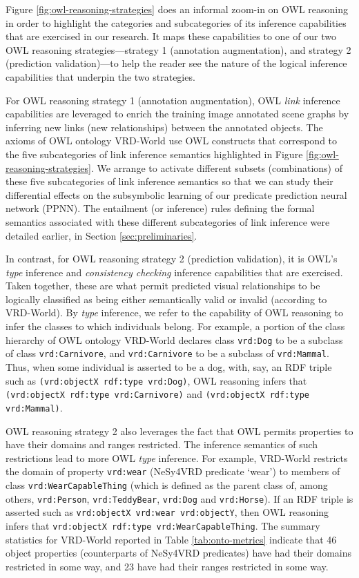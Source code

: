 \documentclass[]{jair}
\begin{document}
Figure \ref{fig:owl-reasoning-strategies} does an informal zoom-in on OWL reasoning in order to highlight the categories and subcategories of its inference capabilities that are exercised in our research.
It maps these capabilities to one of our two OWL reasoning strategies---strategy 1 (annotation augmentation), and strategy 2 (prediction validation)---to help the reader see the nature of the logical inference capabilities that underpin the two strategies.

For OWL reasoning strategy 1 (annotation augmentation), OWL \emph{link} inference capabilities are leveraged to enrich the training image annotated scene graphs by inferring new links (new relationships) between the annotated objects.
The axioms of OWL ontology VRD-World use OWL constructs that correspond to the five subcategories of link inference semantics highlighted in Figure \ref{fig:owl-reasoning-strategies}.
We arrange to activate different subsets (combinations) of these five subcategories of link inference semantics so that we can study their differential effects on the subsymbolic learning of our predicate prediction neural network (PPNN).
The entailment (or inference) rules defining the formal semantics associated with these different subcategories of link inference were detailed earlier, in Section \ref{sec:preliminaries}.

In contrast, for OWL reasoning strategy 2 (prediction validation), it is OWL's \emph{type} inference and \emph{consistency checking} inference capabilities that are exercised.
Taken together, these are what permit predicted visual relationships to be logically classified as being either semantically valid or invalid (according to VRD-World).
By \emph{type} inference, we refer to the capability of OWL reasoning to infer the classes to which individuals belong.
For example, a portion of the class hierarchy of OWL ontology VRD-World declares class \texttt{vrd:Dog} to be a subclass of class \texttt{vrd:Carnivore}, and \texttt{vrd:Carnivore} to be a subclass of \texttt{vrd:Mammal}.
Thus, when some individual is asserted to be a dog, with, say, an RDF triple such as \texttt{(vrd:objectX rdf:type vrd:Dog)}, OWL reasoning infers that \texttt{(vrd:objectX rdf:type vrd:Carnivore)} and \texttt{(vrd:objectX rdf:type vrd:Mammal)}.

OWL reasoning strategy 2 also leverages the fact that OWL permits properties to have their domains and ranges restricted.
The inference semantics of such restrictions lead to more OWL \emph{type} inference.
For example, VRD-World restricts the domain of property \texttt{vrd:wear} (NeSy4VRD predicate `wear') to members of class \texttt{vrd:WearCapableThing} (which is defined as the parent class of, among others, \texttt{vrd:Person}, \texttt{vrd:TeddyBear}, \texttt{vrd:Dog} and \texttt{vrd:Horse}).
If an RDF triple is asserted such as \texttt{vrd:objectX vrd:wear vrd:objectY}, then OWL reasoning infers that \texttt{vrd:objectX rdf:type vrd:WearCapableThing}.
The summary statistics for VRD-World reported in Table \ref{tab:onto-metrics} indicate that 46 object properties (counterparts of NeSy4VRD predicates) have had their domains restricted in some way, and 23 have had their ranges restricted in some way.
\end{document}
